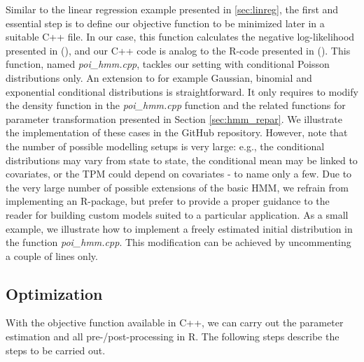\documentclass[bimj,fleqn]{w-art}\usepackage[]{graphicx}\usepackage[]{color}
\theoremstyle{plain}
\theoremstyle{definition}
\begin{document}
Similar to the linear regression example presented in \ref{sec:linreg}, the first and essential step is to define our objective function to be minimized later in a suitable C++ file. In our case, this function calculates the negative log-likelihood presented in (\citet[p. ~48]{zucchini}), and our C++ code is analog to the R-code presented in (\citet[p. ~331 - 333]{zucchini}). This function, named \textit{poi\_hmm.cpp}, tackles our setting with conditional Poisson distributions only. An extension to for example Gaussian, binomial and exponential conditional distributions is straightforward. It only requires to modify the density function in the \textit{poi\_hmm.cpp} function and the related functions for parameter transformation presented in Section \ref{sec:hmm_repar}. We illustrate the implementation of these cases in the GitHub repository. However, note that the number of possible modelling setups is very large: e.g., the conditional distributions may vary from state to state, the conditional mean may be linked to covariates, or the TPM could depend on covariates - to name only a few. Due to the very large number of possible extensions of the basic HMM, we refrain from implementing an R-package, but prefer to provide a proper guidance to the reader for building custom models suited to a particular application. As a small example, we illustrate how to implement a freely estimated initial distribution in the function \textit{poi\_hmm.cpp}. This modification can be achieved by uncommenting a couple of lines only. 


\subsection{Optimization}
\label{sec:tmb_r}

With the objective function available in C++, we can carry out the parameter estimation and all pre-/post-processing in R. The following steps describe the steps to be carried out.
\end{document}
